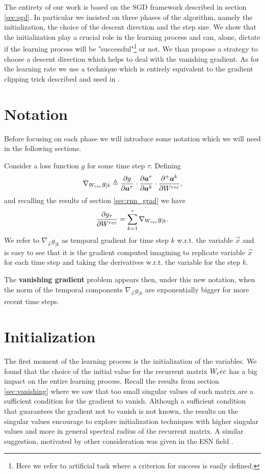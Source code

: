 The entirety of our work is based on the SGD framework described in section \ref{sec:sgd}. In particular we insisted on three phases of the algorithm, namely the initialization, the choice of the descent direction and the step size. We show that the initialization play a crucial role in the learning process and can, alone, dictate if the learning process will be "successful"\footnote{Here we refer to artificial task where a criterion for success is easily defined.} or not. We than propose a strategy to choose a descent direction which helps to deal with the vanishing gradient. As for the learning rate we use a technique which is entirely equivalent to the gradient clipping trick described and used in \cite{pascanu}.

\section{Notation}
Before focusing on each phase we will introduce some notation which we will need in the following sections.

Consider a loss function $g$ for some time step $\tau$. Defining 
\begin{equation}
\nabla_{W_{rec}} g_{|k}  \triangleq \frac{\partial g}{\partial \boldsymbol{a}^{\tau}} \cdot \frac{\partial \boldsymbol{a}^{\tau}}{\partial \boldsymbol{a}^k} \cdot \frac{\partial^+ \boldsymbol{a}^k}{\partial W^{rec}},
\end{equation}
and recalling the results of section \ref{sec:rnn_grad} we have
\begin{equation}
	\frac{\partial g_{\tau}}{\partial W^{rec}} = \sum_{k=1}^{\tau} \nabla_{W_{rec}} g_{|k}.
\end{equation}
We refer to $\nabla_{\vec{x}} g_{|k}$ as temporal gradient for time step $k$ w.r.t. the variable $\vec{x}$ and is easy to see that it is the gradient computed imagining to replicate variable $\vec{x}$ for each time step and taking the derivatives w.r.t. the variable for the step $k$.

The \textbf{vanishing gradient} problem appears then, under this new notation, when the norm of the temporal components $\nabla_{\vec{x}} g_{|k}$ are exponentially bigger for more recent time steps.

\section{Initialization}
The first moment of the learning process is the initialization of the variables. We found that the choice of the initial value for the recurrent matrix $W_rec$ has a big impact on the entire learning process. Recall the results from section  \ref{sec:vanishing} where we saw that too small singular values of such matrix are a sufficient condition for the gradient to vanish. Although a sufficient condition that guarantees the gradient not to vanish is not known, the results on the singular values encourage to explore initialization techniques with higher singular values and more in general spectral radius of the recurrent matrix. A similar suggestion, motivated by other consideration was given in the ESN field \cite{reservoirSummary}.

